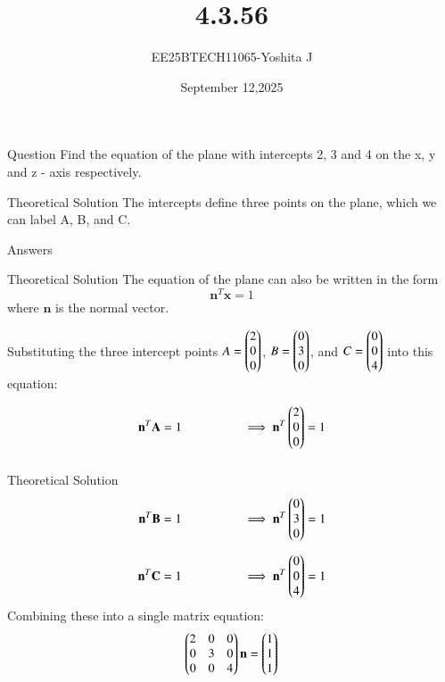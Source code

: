 \documentclass{beamer}
\begin{document}
\title 
{4.3.56}
\date{September 12,2025}


\author 
{EE25BTECH11065-Yoshita J}






\frame{\titlepage}
\begin{frame}{Question}
Find the equation of the plane with intercepts 2, 3 and 4 on the x, y and z - axis respectively.\\

\end{frame}


\begin{frame}{Theoretical Solution}
The intercepts define three points on the plane, which we can label A, B, and C.
\begin{table}[H]    
  \centering
  
  \caption{Answers}
  \label{Answers}
\end{table}
\end{frame}

\begin{frame}{Theoretical Solution}
The equation of the plane can also be written in the form
\[
\mathbf{n}^T \mathbf{x} = 1
\]
  where $\mathbf{n}$ is the normal vector.

Substituting the three intercept points $A = \begin{pmatrix}2\\0\\0\end{pmatrix}$, 
$B = \begin{pmatrix}0\\3\\0\end{pmatrix}$, and $C = \begin{pmatrix}0\\0\\4\end{pmatrix}$ into this equation:

\begin{align}
\mathbf{n}^T \mathbf{A} &= 1 
\;\;\;\;\;\;\;\;\;\;\;\;\;\;\;\;\;
\implies \mathbf{n}^T \begin{pmatrix}2\\0\\0\end{pmatrix} = 1 \\[6pt]
\end{align}

\end{frame}

\begin{frame}{Theoretical Solution}
\begin{align}
\mathbf{n}^T \mathbf{B} &= 1 
\;\;\;\;\;\;\;\;\;\;\;\;\;\;\;\;\;
\implies \mathbf{n}^T \begin{pmatrix}0\\3\\0\end{pmatrix} = 1 \\[6pt]
\mathbf{n}^T \mathbf{C} &= 1 
\;\;\;\;\;\;\;\;\;\;\;\;\;\;\;\;\;
\implies \mathbf{n}^T \begin{pmatrix}0\\0\\4\end{pmatrix} = 1
\end{align}
Combining these into a single matrix equation:
\begin{align}
\begin{pmatrix}
    2 & 0 & 0 \\
    0 & 3 & 0 \\
    0 & 0 & 4
\end{pmatrix}
\mathbf{n}
=
\begin{pmatrix}1\\1\\1\end{pmatrix}
\end{align}


\end{frame}
\end{document}
